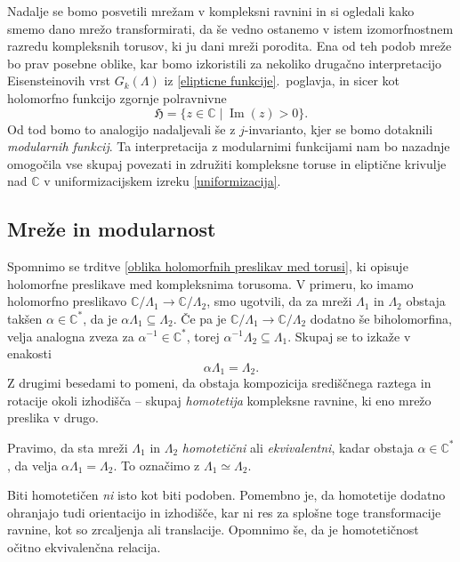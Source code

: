 \documentclass[mat1]{fmfdelo}
\numberwithin{equation}{section}
\newcommand{\C}{\mathbb C}
\newcommand{\HH}{\mathfrak{H}}
\newcommand{\CM}{\mathbb C ^*}
\newcommand{\inv}{^{-1}}
\newcommand{\htp}{\simeq}
\renewcommand\Im{\operatorname{Im}}%
\theoremstyle{definition}
\begin{document}
Nadalje se bomo posvetili mrežam v kompleksni ravnini in si ogledali kako smemo dano mrežo transformirati, da še vedno ostanemo v istem izomorfnostnem razredu kompleksnih torusov, ki ju dani mreži porodita. Ena od teh podob mreže bo prav posebne oblike, kar bomo izkoristili za nekoliko drugačno interpretacijo Eisensteinovih vrst $G_k(\Lambda)$ iz \ref{elipticne funkcije}.\ poglavja, in sicer kot holomorfno funkcijo zgornje polravnivne
\[
    \HH = \{z \in \C \mid \Im(z) > 0\}.
\]
Od tod bomo to analogijo nadaljevali še z $j$-invarianto, kjer se bomo dotaknili \emph{modularnih funkcij}. Ta interpretacija z modularnimi funkcijami nam bo nazadnje omogočila vse skupaj povezati in združiti kompleksne toruse in eliptične krivulje nad $\C$ v uniformizacijskem izreku \ref{uniformizacija}. 

\subsection{Mreže in modularnost}
Spomnimo se trditve \ref{oblika holomorfnih preslikav med torusi}, ki opisuje holomorfne preslikave med kompleksnima torusoma. V primeru, ko imamo holomorfno preslikavo $\C/\Lambda_1 \to \C/\Lambda_2$, smo ugotvili, da za mreži $\Lambda_1$ in $\Lambda_2$ obstaja takšen $\alpha \in \CM$, da je $\alpha\Lambda_1 \subseteq \Lambda_2$. Če pa je $\C/\Lambda_1 \to \C/\Lambda_2$ dodatno še biholomorfina, velja analogna zveza za $\alpha\inv \in \CM$, torej $\alpha\inv\Lambda_2 \subseteq \Lambda_1$. Skupaj se to izkaže v enakosti
\[
    \alpha\Lambda_1 = \Lambda_2. 
\]
Z drugimi besedami to pomeni, da obstaja kompozicija središčnega raztega in rotacije okoli izhodišča -- skupaj \emph{homotetija} kompleksne ravnine, ki eno mrežo preslika v drugo. 

\begin{definicija}
    Pravimo, da sta mreži $\Lambda_1$ in $\Lambda_2$ \emph{homotetični} ali \emph{ekvivalentni}, kadar obstaja $\alpha \in \CM$, da velja $\alpha\Lambda_1 = \Lambda_2$. To označimo z $\Lambda_1 \htp \Lambda_2$.
\end{definicija}

\begin{opomba}
    Biti homotetičen \emph{ni} isto kot biti podoben. Pomembno je, da homotetije dodatno ohranjajo tudi orientacijo in izhodišče, kar ni res za splošne toge transformacije ravnine, kot so zrcaljenja ali translacije. Opomnimo še, da je homotetičnost očitno ekvivalenčna relacija.
\end{opomba}
\end{document}
